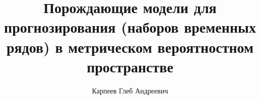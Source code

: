\documentclass{beamer}
\title[\hbox to 56mm{Порождающие модели для прогнозирования}]{Порождающие модели для прогнозирования (наборов временных рядов) в метрическом вероятностном пространстве}
\author[Г.\,А. Карпеев]{Карпеев Глеб Андреевич}
\institute{Московский физико-технический институт}
\date{\footnotesize
\par\smallskip\emph{Курс:} Автоматизация научных исследований\par (практика, В.\,В.~Стрижов)/Группа 128
\par\smallskip\emph{Эксперт:} В.\,В.~Стрижов
\par\smallskip\emph{Консультант:} К.~Яковлев
\par\bigskip\small 2024}
\begin{document}
\begin{frame}
\thispagestyle{empty}
\maketitle
\end{frame}
\end{document}
